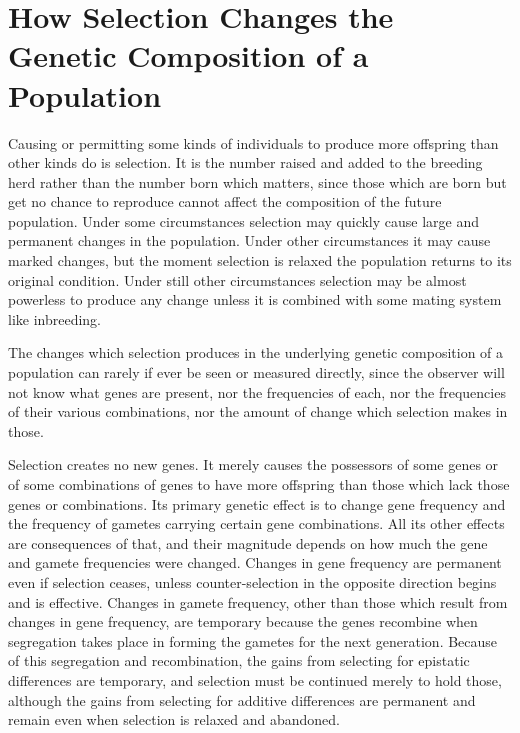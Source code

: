 \chapter[How Selection Changes a Population]{How Selection Changes the Genetic Composition of a Population}
\label{cha:how-selection-changes-genetic-composition-population}

Causing or permitting some kinds of individuals to produce more
offspring than other kinds do is selection. It is the number raised and
added to the breeding herd rather than the number born which matters,
since those which are born but get no chance to reproduce cannot
affect the composition of the future population. Under some circumstances
selection may quickly cause large and permanent changes in the
population. Under other circumstances it may cause marked changes,
but the moment selection is relaxed the population returns to its original
condition. Under still other circumstances selection may be almost
powerless to produce any change unless it is combined with some mating
system like inbreeding.

The changes which selection produces in the underlying genetic
composition of a population can rarely if ever be seen or measured
directly, since the observer will not know what genes are present, nor
the frequencies of each, nor the frequencies of their various combinations,
nor the amount of change which selection makes in those.

Selection creates no new genes. It merely
causes the possessors of
some genes or of some combinations of genes to have more offspring
than those which lack those genes or combinations. Its primary genetic
effect is to change gene frequency and the frequency of gametes carrying
certain gene combinations. All its other effects are consequences of
that, and their magnitude depends on how much the gene and gamete
frequencies were changed. Changes in gene frequency are permanent
even if selection ceases, unless counter-selection in the opposite direction
begins and is effective. Changes in gamete frequency, other than
those which result from changes in gene frequency, are temporary
because the genes recombine when segregation takes place in forming
the gametes for the next generation. Because of this segregation and
recombination, the gains from selecting for epistatic differences are
temporary, and selection must be continued merely to hold those,
although the gains from selecting for additive differences are permanent
and remain even when selection is relaxed and abandoned.

